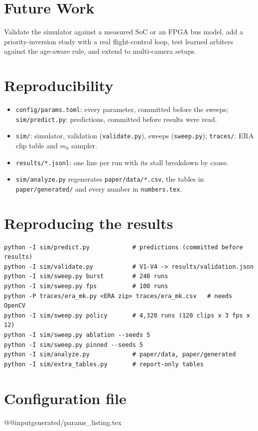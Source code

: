 \documentclass[11pt,a4paper]{article}
\begin{document}
\section{Future Work}\label{sec:future}
Validate the simulator against a measured SoC or an FPGA bus model, add a priority-inversion study with a real flight-control loop, test learned arbiters against the age-aware rule, and extend to multi-camera setups.

\appendix
\section{Reproducibility}
\begin{itemize}
\item \texttt{config/params.toml}: every parameter, committed before the sweeps; \texttt{sim/predict.py}: predictions, committed before results were read.
\item \texttt{sim/}: simulator, validation (\texttt{validate.py}), sweeps (\texttt{sweep.py}); \texttt{traces/}: ERA clip table and $m_k$ sampler.
\item \texttt{results/*.jsonl}: one line per run with its stall breakdown by cause.
\item \texttt{sim/analyze.py} regenerates \texttt{paper/data/*.csv}, the tables in \texttt{paper/generated/} and every number in \texttt{numbers.tex}.
\end{itemize}
\section{Reproducing the results}
\begin{verbatim}
python -I sim/predict.py            # predictions (committed before results)
python -I sim/validate.py           # V1-V4 -> results/validation.json
python -I sim/sweep.py burst        # 240 runs
python -I sim/sweep.py fps          # 100 runs
python -P traces/era_mk.py <ERA zip> traces/era_mk.csv   # needs OpenCV
python -I sim/sweep.py policy       # 4,320 runs (120 clips x 3 fps x 12)
python -I sim/sweep.py ablation --seeds 5
python -I sim/sweep.py pinned --seeds 5
python -I sim/analyze.py            # paper/data, paper/generated
python -I sim/extra_tables.py       # report-only tables
\end{verbatim}
\section{Configuration file}
\csname @@input\endcsname generated/params_listing.tex


\end{document}
